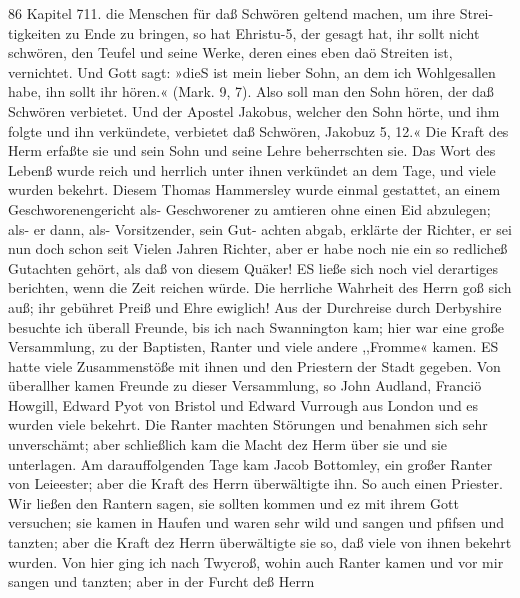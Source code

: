 86 Kapitel 711.
die Menschen für daß Schwören geltend machen, um ihre Strei-
tigkeiten zu Ende zu bringen, so hat Ehristu-5, der gesagt hat,
ihr sollt nicht schwören, den Teufel und seine Werke, deren eines
eben daö Streiten ist, vernichtet. Und Gott sagt: »dieS ist mein
lieber Sohn, an dem ich Wohlgesallen habe, ihn sollt ihr hören.«
(Mark. 9, 7). Also soll man den Sohn hören, der daß Schwören
verbietet. Und der Apostel Jakobus, welcher den Sohn hörte,
und ihm folgte und ihn verkündete, verbietet daß Schwören,
Jakobuz 5, 12.« Die Kraft des Herm erfaßte sie und sein
Sohn und seine Lehre beherrschten sie. Das Wort des Lebenß
wurde reich und herrlich unter ihnen verkündet an dem Tage,
und viele wurden bekehrt.
Diesem Thomas Hammersley wurde einmal gestattet, an
einem Geschworenengericht als- Geschworener zu amtieren ohne
einen Eid abzulegen; als- er dann, als- Vorsitzender, sein Gut-
achten abgab, erklärte der Richter, er sei nun doch schon seit Vielen
Jahren Richter, aber er habe noch nie ein so redlicheß Gutachten
gehört, als daß von diesem Quäker! ES ließe sich noch viel
derartiges berichten, wenn die Zeit reichen würde. Die herrliche
Wahrheit des Herrn goß sich auß; ihr gebühret Preiß und Ehre
ewiglich!
Aus der Durchreise durch Derbyshire besuchte ich überall
Freunde, bis ich nach Swannington kam; hier war eine große
Versammlung, zu der Baptisten, Ranter und viele andere ,,Fromme«
kamen. ES hatte viele Zusammenstöße mit ihnen und den Priestern
der Stadt gegeben. Von überallher kamen Freunde zu dieser
Versammlung, so John Audland, Franciö Howgill, Edward Pyot
von Bristol und Edward Vurrough aus London und es wurden
viele bekehrt. Die Ranter machten Störungen und benahmen sich
sehr unverschämt; aber schließlich kam die Macht dez Herm über
sie und sie unterlagen. Am darauffolgenden Tage kam Jacob
Bottomley, ein großer Ranter von Leieester; aber die Kraft des
Herrn überwältigte ihn. So auch einen Priester. Wir ließen
den Rantern sagen, sie sollten kommen und ez mit ihrem Gott
versuchen; sie kamen in Haufen und waren sehr wild und sangen
und pfifsen und tanzten; aber die Kraft dez Herrn überwältigte
sie so, daß viele von ihnen bekehrt wurden.
Von hier ging ich nach Twycroß, wohin auch Ranter kamen
und vor mir sangen und tanzten; aber in der Furcht deß Herrn


